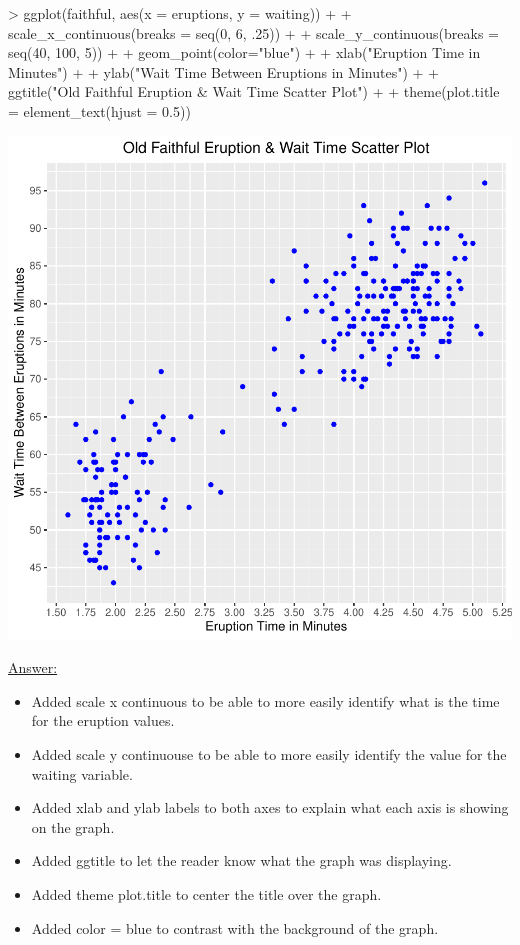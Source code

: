 \documentclass[12pt,letterpaper,final]{article}
\begin{document}
\begin{enumerate}
\begin{enumerate}
\begin{Schunk}
\begin{Sinput}
> ggplot(faithful, aes(x = eruptions, y = waiting)) +
+   scale_x_continuous(breaks = seq(0, 6, .25)) +
+   scale_y_continuous(breaks = seq(40, 100, 5)) +
+   geom_point(color="blue") +
+   xlab("Eruption Time in Minutes") +
+   ylab("Wait Time Between Eruptions in Minutes") +
+   ggtitle("Old Faithful Eruption & Wait Time Scatter Plot") +
+   theme(plot.title = element_text(hjust = 0.5))
\end{Sinput}
\end{Schunk}
\includegraphics{rnw_example-011}

\underline{Answer:}
\begin{itemize}
\item Added scale x continuous to be able to more easily identify what is the time for the eruption values.
\item Added scale y continuouse to be able to more easily identify the value for the waiting variable.
\item Added xlab and ylab labels to both axes to explain what each axis is showing on the graph.
\item Added ggtitle to let the reader know what the graph was displaying.
\item Added theme plot.title to center the title over the graph.
\item Added color = blue to contrast with the background of the graph.
\end{itemize}






\end{enumerate}
\end{enumerate}
\end{document}
